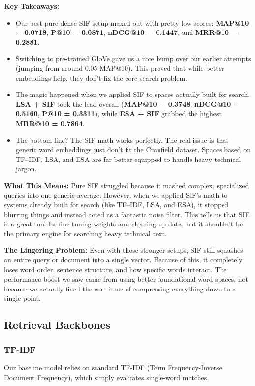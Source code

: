 \documentclass[runningheads]{llncs}
\begin{document}
\textbf{Key Takeaways:}
\begin{itemize}
    \item Our best pure dense SIF setup maxed out with pretty low scores: \textbf{MAP@10 = 0.0718}, \textbf{P@10 = 0.0871}, \textbf{nDCG@10 = 0.1447}, and \textbf{MRR@10 = 0.2881}.
    \item Switching to pre-trained GloVe gave us a nice bump over our earlier attempts (jumping from around $0.05$ MAP@10). This proved that while better embeddings help, they don't fix the core search problem.
    \item The magic happened when we applied SIF to spaces actually built for search. \textbf{LSA + SIF} took the lead overall (\textbf{MAP@10 = 0.3748}, \textbf{nDCG@10 = 0.5160}, \textbf{P@10 = 0.3311}), while \textbf{ESA + SIF} grabbed the highest \textbf{MRR@10 = 0.7864}.
    \item The bottom line? The SIF math works perfectly. The real issue is that generic word embeddings just don't fit the Cranfield dataset. Spaces based on TF--IDF, LSA, and ESA are far better equipped to handle heavy technical jargon.
\end{itemize}
\textbf{What This Means:}
Pure SIF struggled because it mashed complex, specialized queries into one generic average. However, when we applied SIF's math to systems already built for search (like TF--IDF, LSA, and ESA), it stopped blurring things and instead acted as a fantastic noise filter. This tells us that SIF is a great tool for fine-tuning weights and cleaning up data, but it shouldn't be the primary engine for searching heavy technical text.

\textbf{The Lingering Problem:}
Even with those stronger setups, SIF still squashes an entire query or document into a single vector. Because of this, it completely loses word order, sentence structure, and how specific words interact. The performance boost we saw came from using better foundational word spaces, not because we actually fixed the core issue of compressing everything down to a single point.
\subsection{Retrieval Backbones}

\subsubsection{TF-IDF}
Our baseline model relies on standard TF-IDF (Term Frequency-Inverse Document Frequency), which simply evaluates single-word matches.
\end{document}
